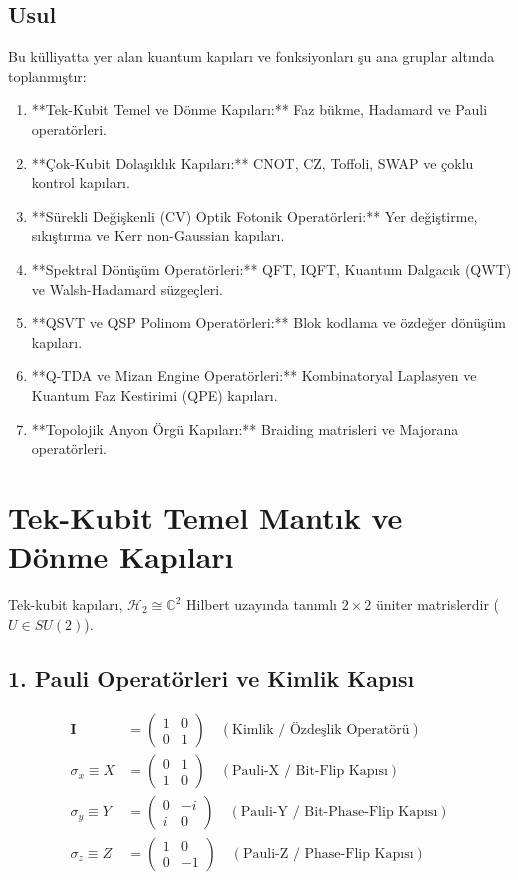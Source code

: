 \documentclass[11pt, a4paper]{article}
\begin{document}
\subsection{Usul}
Bu külliyatta yer alan kuantum kapıları ve fonksiyonları şu ana gruplar altında toplanmıştır:
\begin{enumerate}
    \item **Tek-Kubit Temel ve Dönme Kapıları:** Faz bükme, Hadamard ve Pauli operatörleri.
    \item **Çok-Kubit Dolaşıklık Kapıları:** CNOT, CZ, Toffoli, SWAP ve çoklu kontrol kapıları.
    \item **Sürekli Değişkenli (CV) Optik Fotonik Operatörleri:** Yer değiştirme, sıkıştırma ve Kerr non-Gaussian kapıları.
    \item **Spektral Dönüşüm Operatörleri:** QFT, IQFT, Kuantum Dalgacık (QWT) ve Walsh-Hadamard süzgeçleri.
    \item **QSVT ve QSP Polinom Operatörleri:** Blok kodlama ve özdeğer dönüşüm kapıları.
    \item **Q-TDA ve Mizan Engine Operatörleri:** Kombinatoryal Laplasyen ve Kuantum Faz Kestirimi (QPE) kapıları.
    \item **Topolojik Anyon Örgü Kapıları:** Braiding matrisleri ve Majorana operatörleri.
\end{enumerate}

\section{Tek-Kubit Temel Mantık ve Dönme Kapıları}

Tek-kubit kapıları, $\mathcal{H}_2 \cong \mathbb{C}^2$ Hilbert uzayında tanımlı $2 \times 2$ üniter matrislerdir ($U \in SU(2)$).

\subsection{1. Pauli Operatörleri ve Kimlik Kapısı}
\begin{align}
\mathbf{I} &= \begin{pmatrix} 1 & 0 \\ 0 & 1 \end{pmatrix} \quad (\text{Kimlik / Özdeşlik Operatörü}) \\
\sigma_x \equiv X &= \begin{pmatrix} 0 & 1 \\ 1 & 0 \end{pmatrix} \quad (\text{Pauli-X / Bit-Flip Kapısı}) \\
\sigma_y \equiv Y &= \begin{pmatrix} 0 & -i \\ i & 0 \end{pmatrix} \quad (\text{Pauli-Y / Bit-Phase-Flip Kapısı}) \\
\sigma_z \equiv Z &= \begin{pmatrix} 1 & 0 \\ 0 & -1 \end{pmatrix} \quad (\text{Pauli-Z / Phase-Flip Kapısı})
\end{align}
\end{document}
